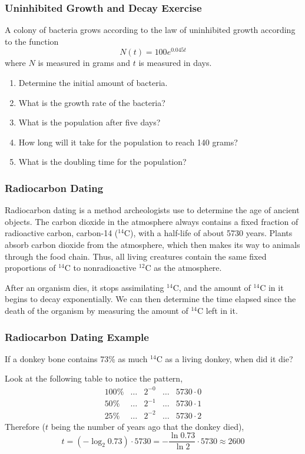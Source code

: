 \documentclass[xcolor=dvipsnames]{beamer}
\begin{document}
\begin{frame}
  \frametitle{Uninhibited Growth and Decay Exercise}
A colony of bacteria grows according to the law of uninhibited growth
according to the function
\begin{equation}
  \label{eq:chiowezo}
  N(t)=100e^{0.045t}
\end{equation}
where $N$ is measured in grams and $t$ is measured in days.
  \begin{enumerate}
  \item<1-> Determine the initial amount of bacteria.
  \item<2-> What is the growth rate of the bacteria?
  \item<3-> What is the population after five days?
  \item<4-> How long will it take for the population to reach 140
    grams?
  \item<5-> What is the doubling time for the population?
  \end{enumerate}
\end{frame}

\begin{frame}
  \frametitle{Radiocarbon Dating}
Radiocarbon dating is a method archeologists use to determine the age
of ancient objects. The carbon dioxide in the atmosphere always
contains a fixed fraction of radioactive carbon, carbon-14 ($^{14}$C),
with a half-life of about 5730 years. Plants absorb carbon dioxide
from the atmosphere, which then makes its way to animals through the
food chain. Thus, all living creatures contain the same fixed
proportions of $^{14}$C to nonradioactive $^{12}$C as the atmosphere.

\medskip

After an organism dies, it stops assimilating $^{14}$C, and the amount
of $^{14}$C in it begins to decay exponentially. We can then determine
the time elapsed since the death of the organism by measuring the
amount of $^{14}$C left in it.
\end{frame}

\begin{frame}
  \frametitle{Radiocarbon Dating Example}
If a donkey bone contains 73\% as much $^{14}$C as a living donkey,
when did it die?

\medskip

Look at the following table to notice the pattern,
\begin{equation}
  \label{eq:sayeeziu}
  \begin{array}{rcccl}
        100\% & \ldots & 2^{-0} & \ldots & 5730\cdot{}0 \\
        50\% & \ldots & 2^{-1} & \ldots & 5730\cdot{}1 \\
        25\% & \ldots & 2^{-2} & \ldots & 5730\cdot{}2
  \end{array}
\end{equation}
Therefore ($t$ being the number of years ago that the donkey died),
\begin{equation}
  \label{eq:anuvuama}
  t=\left(-\log_{2}0.73\right)\cdot{}5730=-\frac{\ln{}0.73}{\ln{}2}\cdot{}5730\approx{}2600
\end{equation}
\end{frame}
\end{document}
